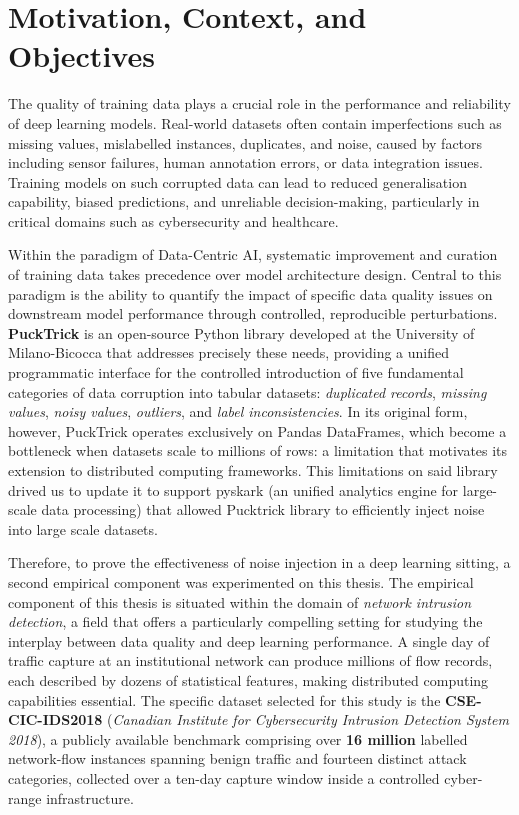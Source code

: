 \documentclass{article}
\begin{document}
\section{Motivation, Context, and Objectives}

The quality of training data plays a crucial role in the performance and reliability of deep learning models. Real-world datasets often contain imperfections such as missing values, mislabelled instances, duplicates, and noise, caused by factors including sensor failures, human annotation errors, or data integration issues. Training models on such corrupted data can lead to reduced generalisation capability, biased predictions, and unreliable decision-making, particularly in critical domains such as cybersecurity and healthcare.


Within the paradigm of Data-Centric AI, systematic improvement and
curation of training data takes precedence over model architecture
design. Central to this paradigm is the ability to quantify the impact
of specific data quality issues on downstream model performance through
controlled, reproducible perturbations.
\textbf{PuckTrick} is an open-source Python library
developed at the University of Milano-Bicocca that addresses precisely
these needs, providing a unified programmatic interface for the
controlled introduction of five fundamental categories of data
corruption into tabular datasets: \emph{duplicated records},
\emph{missing values}, \emph{noisy values}, \emph{outliers}, and
\emph{label inconsistencies}. In its original form, however, PuckTrick
operates exclusively on Pandas DataFrames, which become a bottleneck
when datasets scale to millions of rows: a limitation that motivates
its extension to distributed computing frameworks. This limitations on said library 
drived us to update it to support pyskark (an unified analytics engine for
large-scale data processing) that allowed Pucktrick library to efficiently inject noise
into large scale datasets. 

Therefore, to prove the effectiveness of noise injection in a deep learning sitting, a second empirical component was experimented on this thesis. The empirical component of this thesis is situated within the domain of \emph{network intrusion detection}, a field that offers a particularly
compelling setting for studying the interplay between data quality and
deep learning performance. A single day of traffic capture at an
institutional network can produce millions of flow records, each
described by dozens of statistical features, making distributed
computing capabilities essential. The specific dataset selected for this
study is the \textbf{CSE-CIC-IDS2018} (\emph{Canadian Institute for
Cybersecurity Intrusion Detection System 2018}), a publicly
available benchmark comprising over \textbf{16 million} labelled
network-flow instances spanning benign traffic and fourteen distinct
attack categories, collected over a ten-day capture window inside a
controlled cyber-range infrastructure.
\end{document}
